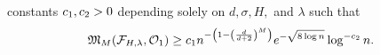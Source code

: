 \begin{theorem}
\begin{enumerate}[1.]
    constants $c_1, c_2 > 0$ depending solely on $d, \sigma, H,$ and $\lambda$ such
    that
    \begin{align*}
      \mathfrak{M}_M(\mathcal{F}_{H, \lambda}, \mathcal{O}_1) \geq c_1
      n^{- \left(1 - \left( \frac{d}{d+2} \right)^M \right)  } 
      e^{-\sqrt{8\log n}} \log^{-c_2} n.
    \end{align*}
  \end{enumerate}
\end{theorem}

